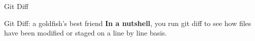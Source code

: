 \begin{frame}{Git Diff}
    \begin{block}{Git Diff: a goldfish's best friend}
    \textbf{In a nutshell}, you run git diff to see how files have been modified or staged on a line by line basis.
    
    \end{block}
    \pause
\end{frame}
